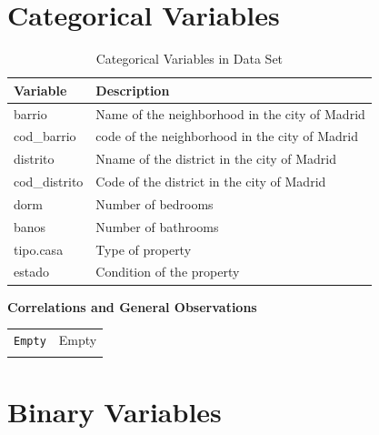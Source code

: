 \documentclass[11pt]{report} %
\begin{document}


\section{Categorical Variables}

\begin{table}[H]
\centering
\caption{Categorical Variables in Data Set}
\label{tab:categorical_table}
\begin{tabular}{@{}lp{10cm}@{}}
\toprule
\textbf{Variable} & \textbf{Description} \\ \midrule
barrio & Name of the neighborhood in the city of Madrid \\
cod\_barrio & code of the neighborhood in the city of Madrid \\
distrito & Nname of the district in the city of Madrid \\
cod\_distrito & Code of the district in the city of Madrid \\
dorm & Number of bedrooms \\
banos & Number of bathrooms \\
tipo.casa & Type of property \\
estado & Condition of the property \\ \bottomrule
\end{tabular}
\end{table}


\textbf{Correlations and General Observations} \\


\begin{longtable}{p{} | p{}}

    \texttt{Empty} & Empty \\ \\
 
\end{longtable}







\section{Binary Variables}
\end{document}
